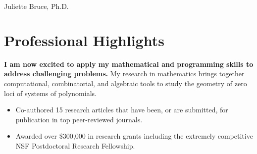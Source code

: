\documentclass[
	10pt, %
]{FreemanCV}
\begin{document}
\begin{paracol}{2} %


\parbox[][0.11\textheight][c]{\linewidth}{ %
	\centering %
	
	{\sffamily\Huge Juliette Bruce, Ph.D.} %
	
	\medskip %
	
	
	\vfill %
}

\vspace{-.5cm}
\section{Professional Highlights}

\textbf{I am now excited to apply my mathematical and programming skills to address challenging problems. } My research in mathematics brings together computational, combinatorial, and algebraic tools to study the geometry of zero loci of systems of polynomials. 
\begin{itemize}[leftmargin=*]
\item Co-authored 15 research articles that have been, or are submitted, for publication in top peer-reviewed journals. 
\item Awarded over \$300,000 in research grants including the extremely competitive NSF Postdoctoral Research Fellowship.%
\end{itemize}


\end{paracol}
\end{document}
